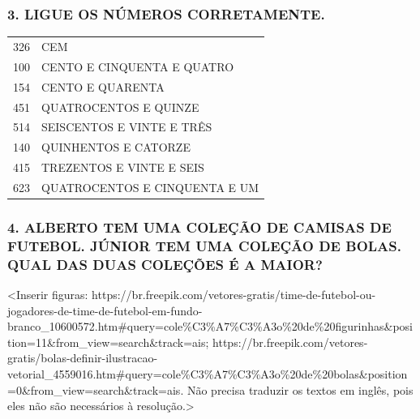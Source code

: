 
\subsubsection{3. LIGUE OS NÚMEROS CORRETAMENTE.
}\label{ligue-os-nuxfameros-corretamente}

\begin{longtable}[]{@{}ll@{}}
\toprule
326 & CEM\tabularnewline
100 & CENTO E CINQUENTA E QUATRO\tabularnewline
154 & CENTO E QUARENTA\tabularnewline
451 & QUATROCENTOS E QUINZE\tabularnewline
514 & SEISCENTOS E VINTE E TRÊS\tabularnewline
140 & QUINHENTOS E CATORZE\tabularnewline
415 & TREZENTOS E VINTE E SEIS\tabularnewline
623 & QUATROCENTOS E CINQUENTA E UM\tabularnewline
\bottomrule
\end{longtable}


\subsubsection{4. ALBERTO TEM UMA COLEÇÃO DE CAMISAS DE FUTEBOL. JÚNIOR
TEM UMA COLEÇÃO DE BOLAS. QUAL DAS DUAS COLEÇÕES É A MAIOR?
}\label{alberto-tem-uma-coleuxe7uxe3o-de-camisas-de-futebol.-juxfanior-tem-uma-coleuxe7uxe3o-de-bolas.-qual-das-duas-coleuxe7uxf5es-uxe9-a-maior}

\textless{}Inserir figuras:
https://br.freepik.com/vetores-gratis/time-de-futebol-ou-jogadores-de-time-de-futebol-em-fundo-branco\_10600572.htm\#query=cole\%C3\%A7\%C3\%A3o\%20de\%20figurinhas\&position=11\&from\_view=search\&track=ais;
https://br.freepik.com/vetores-gratis/bolas-definir-ilustracao-vetorial\_4559016.htm\#query=cole\%C3\%A7\%C3\%A3o\%20de\%20bolas\&position=0\&from\_view=search\&track=ais.
Não precisa traduzir os textos em inglês, pois eles não são necessários
à resolução.\textgreater{}

